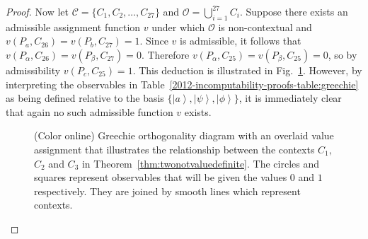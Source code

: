 \documentclass[%
 preprint,
 showpacs,
 showkeys,
 amsmath,
 amssymb,
 aps,
 pra,
 ]{revtex4-1}
\theoremstyle{definition}
\newcommand{\ket}[1]{\left| #1 \right>}
\begin{document}
\begin{proof}
	Now let $\mathcal{C} = \{ C_1, C_2, \dots, C_{27} \}$ and $\mathcal{O} = \bigcup_{i = 1}^{27} C_i$.
	Suppose there exists an admissible assignment function $v$ under which $\mathcal{O}$ is non-contextual and $v(P_a, C_{26}) = v(P_b, C_{27}) = 1$.
	Since $v$ is admissible, it follows that $v(P_\alpha, C_{26}) = v(P_\beta, C_{27}) = 0$.
	Therefore $v(P_\alpha, C_{25}) = v(P_\beta, C_{25}) = 0$, so by admissibility $v(P_c, C_{25}) = 1$.
	This deduction is illustrated in Fig.~\ref{2012-incomputability-proofs-fig:greechie-mini}.
	However, by interpreting the observables in Table~\ref{2012-incomputability-proofs-table:greechie} as being defined relative to the basis $\{\ket{a},\ket{\psi},\ket{\phi}\}$, it is immediately clear that again no such admissible function $v$ exists.
	
	\begin{figure}[t]
	\begin{center}
	\end{center}
	\caption{(Color online) Greechie orthogonality diagram with an overlaid value assignment that illustrates the relationship between the contexts $C_1,$ $C_2$ and $C_3$ in Theorem~\ref{thm:twonotvaluedefinite}.
		 The circles and squares represent observables that will be given the values $0$ and $1$ respectively.
		 They are joined by smooth lines which represent contexts.}
	\label{2012-incomputability-proofs-fig:greechie-mini}
	\end{figure}
\end{proof}
\end{document}
